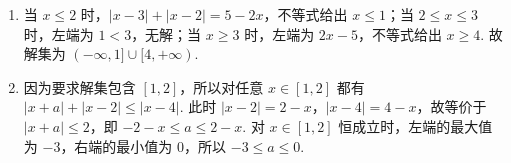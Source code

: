 \begin{solution}
\begin{enumerate}
\item 当 \(x\leqslant2\) 时，\(|x-3|+|x-2|=5-2x\)，不等式给出 \(x\leqslant1\)；当 \(2\leqslant x\leqslant3\) 时，左端为 \(1<3\)，无解；当 \(x\geqslant3\) 时，左端为 \(2x-5\)，不等式给出 \(x\geqslant4\). 故解集为 \((-\infty,1]\cup[4,+\infty)\).
\item 因为要求解集包含 \([1,2]\)，所以对任意 \(x\in[1,2]\) 都有 \(|x+a|+|x-2|\leqslant|x-4|\). 此时 \(|x-2|=2-x\)，\(|x-4|=4-x\)，故等价于 \(|x+a|\leqslant2\)，即 \(-2-x\leqslant a\leqslant2-x\). 对 \(x\in[1,2]\) 恒成立时，左端的最大值为 \(-3\)，右端的最小值为 \(0\)，所以 \(-3\leqslant a\leqslant0\).
\end{enumerate}
\end{solution}
